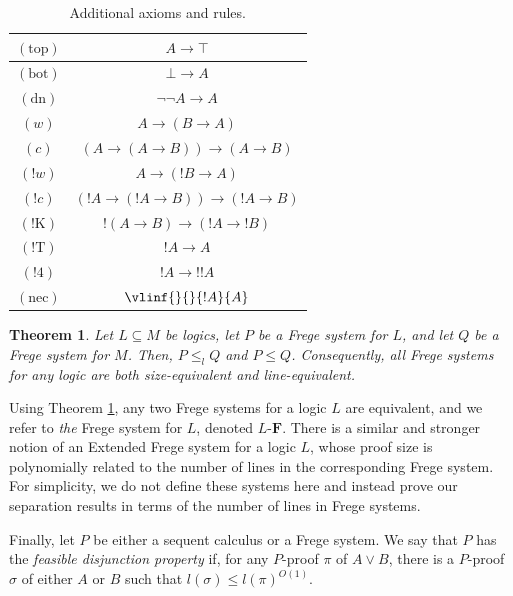 \documentclass[12pt,a4paper]{article}
\theoremstyle{plain}
\newtheorem{theorem}{Theorem}
\theoremstyle{definition}
\newcommand{\F}{\mathbf{F}}
\begin{document}
\begin{table}[tbh]
\centering
\normalsize
\renewcommand{\arraystretch}{0.95}
\begin{tabular}{|c|c|}
\hline
$(\text{top})$ & $A \to \top$\\
\hline
$(\text{bot})$ & $\bot \to A$ \\
\hline
$(\text{dn})$ & $\neg \neg A \to A$ \\
\hline
$(w)$ & $A \to (B \to A)$ \\
\hline
$(c)$ & $(A \to (A \to B)) \to (A \to B)$ \\
\hline
$(!w)$ & $A \to (!B \to A)$\\
\hline
$(!c)$ & $(!A \to (!A \to B)) \to (!A \to B)$\\
\hline
$(!\text{K})$ & $!(A \to B) \to (!A \to !B)$\\
\hline
$(!\text{T})$ & $!A \to A$\\
\hline
$(!\text{4})$ & $!A \to !!A$\\
\hline
$(\text{nec})$ & $\vlinf{}{}{!A}{A}$\\
\hline
\end{tabular}
\vspace{3pt}
\caption{Additional axioms and rules.}
\label{Fig: linear}
\end{table}

\begin{theorem}\cite[Lemma 3.11]{Raheleh}\label{Lem: Equivalence Of Frege}
Let $L \subseteq M$ be logics, let $P$ be a Frege system for $L$, and let $Q$ be a Frege system for $M$. Then, $P \leq_l Q$ and $P \leq Q$. Consequently, all Frege systems for any logic are both size-equivalent and line-equivalent.
\end{theorem}

Using Theorem \ref{Lem: Equivalence Of Frege}, any two Frege systems for a logic $L$ are equivalent, and we refer to \emph{the} Frege system for $L$, denoted $L$-$\F$. There is a similar and stronger notion of an Extended Frege system for a logic $L$, whose proof size is polynomially related to the number of lines in the corresponding Frege system. For simplicity, we do not define these systems here and instead prove our separation results in terms of the number of lines in Frege systems.

Finally, let $P$ be either a sequent calculus or a Frege system. We say that $P$ has the \emph{feasible disjunction property} if, for any $P$-proof $\pi$ of $A \vee B$, there is a $P$-proof $\sigma$ of either $A$ or $B$ such that
$
l(\sigma) \leq l(\pi)^{O(1)}.
$
\end{document}
